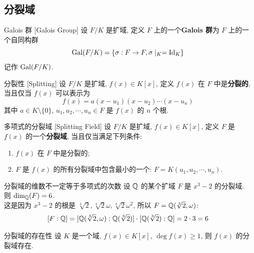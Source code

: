     \subsection{分裂域}

        \begin{dfn}
            {Galois 群}
            [Galois Group]
            设 \(F/K\) 是扩域, 定义 \(F\) 上的一个\textbf{Galois 群}为 \(F\) 上的一个自同构群
            \[\operatorname{Gal}(F/K)=\{\sigma:F\to F, \sigma\mid_K=\operatorname{Id}_K\}\]
            记作 \(\operatorname{Gal}(F/K)\).
        \end{dfn}

        \begin{dfn}
            {分裂性}
            [Splitting]
            设 \(F/K\) 是扩域, \(f(x)\in K[x]\), 定义 \(f(x)\) 在 \(F\) 中是\textbf{分裂的}, 当且仅当 \(f(x)\) 可以表示为
            \[f(x)=a(x-u_1)(x-u_2)\cdots(x-u_n)\]
            其中 \(a\in K\setminus\{0\}\), \(u_1,u_2,\cdots,u_n\in F\) 是 \(f(x)\) 的 \(n\) 个根.
        \end{dfn}

        \begin{dfn}
            {多项式的分裂域}
            [Splitting Field]
            设 \(F/K\) 是扩域, \(f(x)\in K[x]\), 定义 \(F\) 是 \(f(x)\) 的一个\textbf{分裂域}, 当且仅当满足下列条件:
            \begin{enumerate}
                \item \(f(x)\) 在 \(F\) 中是分裂的;
                \item \(F\) 是 \(f(x)\) 的所有分裂域中包含最小的一个: \(F=K(u_1,u_2,\cdots,u_n)\).
            \end{enumerate}
        \end{dfn}

        \begin{ins}
            {分裂域的维数不一定等于多项式的次数}
            设 \(\operatorname{\mathbb{Q}}\) 的某个扩域 \(F\) 是 \(x^3-2\) 的分裂域. 则 \(\dim_{\operatorname{\mathbb{Q}}}(F)=6\).\\
            这是因为 \(x^3-2\) 的根是 \(\sqrt[3]{2}, \sqrt[3]{2}\omega, \sqrt[3]{2}\omega^2\), 所以 \(F=\operatorname{\mathbb{Q}}(\sqrt[3]{2}, \omega)\):
            \[[F:\operatorname{\mathbb{Q}}] = [\operatorname{\mathbb{Q}}(\sqrt[3]{2}, \omega): \operatorname{\mathbb{Q}}(\sqrt[3]{2})]\cdot [\operatorname{\mathbb{Q}}(\sqrt[3]{2}): \operatorname{\mathbb{Q}}]=2\cdot 3=6 \]
        \end{ins}

        \begin{thm}
            {分裂域的存在性}
            设 \(K\) 是一个域, \(f(x)\in K[x]\), \(\deg f(x)\geq 1\), 则 \(f(x)\) 的分裂域存在.
        \end{thm}

